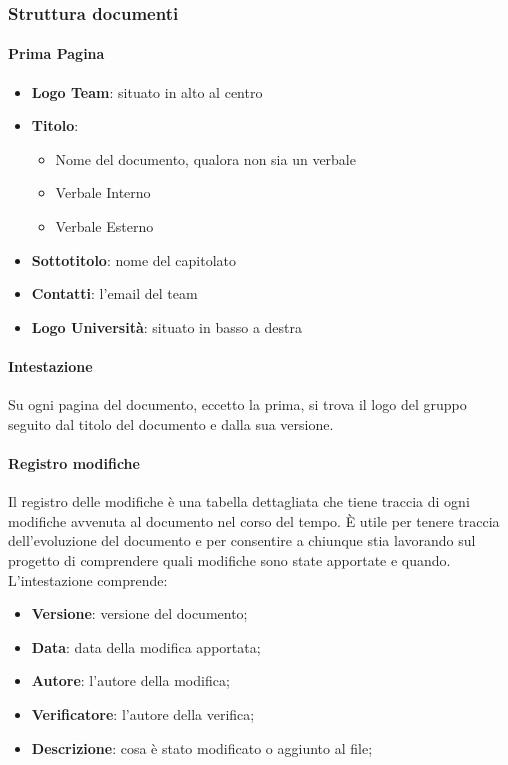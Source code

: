 \subsubsection{Struttura documenti}

    \paragraph{Prima Pagina}
    \begin{itemize}
    \item \textbf{Logo Team}: situato in alto al centro
    \item \textbf{Titolo}: \begin{itemize}
            \item Nome del documento, qualora non sia un verbale
            \item Verbale Interno
            \item Verbale Esterno
            \end{itemize}
    \item\textbf{Sottotitolo}: nome del capitolato
    \item\textbf{Contatti}: l'email del team
    \item\textbf{Logo Università}: situato in basso a destra
    \end{itemize}

    \paragraph{Intestazione}
    Su ogni pagina del documento, eccetto la prima, si trova il logo del gruppo seguito dal titolo del documento e dalla sua versione.\\

    \paragraph{Registro modifiche}
    Il registro delle modifiche è una tabella dettagliata che tiene traccia di ogni modifiche avvenuta al documento nel corso del tempo. È utile per tenere traccia dell’evoluzione del documento e per consentire a chiunque stia lavorando sul progetto di comprendere quali modifiche sono state apportate e quando.
    L’intestazione comprende:
    \begin{itemize}
    \item \textbf{Versione}: versione del documento;
    \item \textbf{Data}: data della modifica apportata;
    \item \textbf{Autore}: l’autore della modifica;
    \item \textbf{Verificatore}: l’autore della verifica;
    \item \textbf{Descrizione}: cosa è stato modificato o aggiunto al file;
    \end{itemize}

